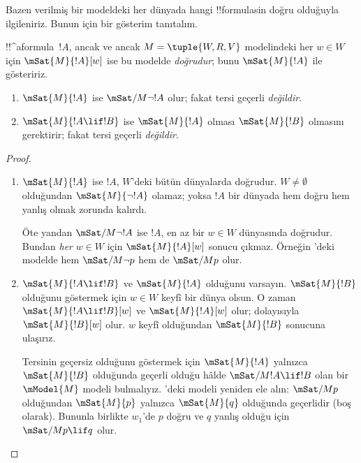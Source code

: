 \documentclass[../../../include/open-logic-section]{subfiles}
\begin{document}


Bazen verilmiş bir modeldeki her dünyada hangi !!{formula}s{}in doğru olduğuyla
ilgileniriz. Bunun için bir gösterim tanıtalım.

\begin{defn}
  !!^a{formula}~$!A$, ancak ve ancak $M = \tuple{W, R, V}$ modelindeki her
  $w \in W$ için $\mSat{M}{!A}[w]$ ise bu modelde \emph{doğrudur}; bunu
  $\mSat{M}{!A}$ ile gösteririz.
\end{defn}

\begin{prop}
  \begin{enumerate}
  \item $\mSat{M}{!A}$ ise $\mSat/{M}{\lnot !A}$ olur; fakat tersi geçerli
    \emph{değildir}.
  \item $\mSat{M}{!A \lif !B}$ ise $\mSat{M}{!A}$ olması
    $\mSat{M}{!B}$ olmasını gerektirir; fakat tersi geçerli \emph{değildir}.
  \end{enumerate}
\end{prop}

\begin{proof}
  \begin{enumerate}
  \item $\mSat{M}{!A}$ ise $!A$, $W$'deki bütün dünyalarda doğrudur.
    $W \neq \emptyset$ olduğundan $\mSat{M}{\lnot!A}$ olamaz; yoksa $!A$
    bir dünyada hem doğru hem yanlış olmak zorunda kalırdı.

    Öte yandan $\mSat/{M}{\lnot !A}$ ise $!A$, en az bir $w \in W$
    dünyasında doğrudur. Bundan \emph{her} $w \in W$ için
    $\mSat{M}{!A}[w]$ sonucu
    çıkmaz. Örneğin 'deki modelde hem
    $\mSat/{M}{\lnot p}$ hem de $\mSat/{M}{p}$ olur.
  \item $\mSat{M}{!A \lif !B}$ ve $\mSat{M}{!A}$ olduğunu varsayın.
    $\mSat{M}{!B}$ olduğunu göstermek için $w \in W$ keyfî bir dünya olsun.
    O zaman $\mSat{M}{!A \lif !B}[w]$ ve $\mSat{M}{!A}[w]$ olur; dolayısıyla
    $\mSat{M}{!B}[w]$ olur. $w$ keyfî olduğundan $\mSat{M}{!B}$ sonucuna
    ulaşırız.

    Tersinin geçersiz olduğunu göstermek için $\mSat{M}{!A}$ yalnızca
    $\mSat{M}{!B}$ olduğunda geçerli olduğu hâlde
    $\mSat/{M}{!A \lif !B}$ olan bir $\mModel{M}$ modeli bulmalıyız.
    'deki modeli yeniden ele alın: $\mSat/{M}{p}$
    olduğundan $\mSat{M}{p}$ yalnızca $\mSat{M}{q}$ olduğunda geçerlidir
    (boş olarak). Bununla birlikte $w_1$'de $p$ doğru ve $q$ yanlış olduğu
    için $\mSat/{M}{p \lif q}$ olur.
  \end{enumerate}
\end{proof}
\end{document}
